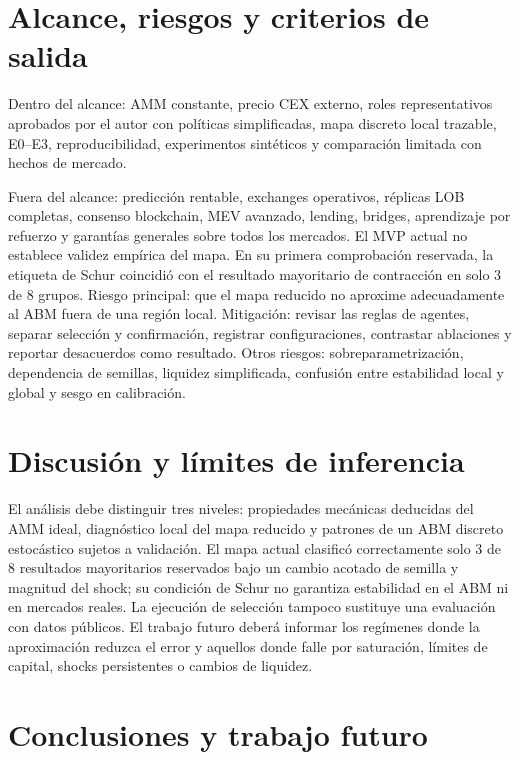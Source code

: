 \section{Alcance, riesgos y criterios de salida}

Dentro del alcance: AMM constante, precio CEX externo, roles representativos aprobados por el autor
con políticas simplificadas, mapa discreto local trazable, E0--E3, reproducibilidad, experimentos
sintéticos y comparación limitada con hechos de mercado.

Fuera del alcance: predicción rentable, exchanges operativos, réplicas LOB completas,
consenso blockchain, MEV avanzado, lending, bridges, aprendizaje por refuerzo y
garantías generales sobre todos los mercados. El MVP actual no establece validez
empírica del mapa. En su primera comprobación reservada, la etiqueta de Schur coincidió
con el resultado mayoritario de contracción en solo 3 de 8 grupos. Riesgo principal:
que el mapa reducido no aproxime adecuadamente al ABM fuera de una región local.
Mitigación: revisar las reglas de agentes, separar selección y confirmación, registrar
configuraciones, contrastar ablaciones y reportar desacuerdos como resultado. Otros
riesgos: sobreparametrización, dependencia de semillas, liquidez simplificada, confusión
entre estabilidad local y global y sesgo en calibración.

\section{Discusión y límites de inferencia}

El análisis debe distinguir tres niveles: propiedades mecánicas deducidas del AMM ideal,
diagnóstico local del mapa reducido y patrones de un ABM discreto estocástico sujetos a
validación. El mapa actual clasificó correctamente solo 3 de 8 resultados mayoritarios
reservados bajo un cambio acotado de semilla y magnitud del shock; su condición de Schur
no garantiza estabilidad en el ABM ni en mercados reales. La ejecución de selección
tampoco sustituye una evaluación con datos públicos. El trabajo futuro deberá informar
los regímenes donde la aproximación reduzca el error y aquellos donde falle por
saturación, límites de capital, shocks persistentes o cambios de liquidez.

\section{Conclusiones y trabajo futuro}

